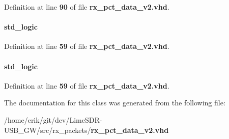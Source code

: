 Definition at line {\bf 90} of file {\bf rx\+\_\+pct\+\_\+data\+\_\+v2.\+vhd}.

\paragraph[{tx\+\_\+pct\+\_\+loss\+\_\+reg0}]{ {\bfseries \textcolor{comment}{std\+\_\+logic}\textcolor{vhdlchar}{ }} \hspace{0.3cm}{\ttfamily [Signal]}}\label{classrx__pct__data__v2_1_1arch_a1331098bc324a5e77becd6d1ec897c17}


Definition at line {\bf 59} of file {\bf rx\+\_\+pct\+\_\+data\+\_\+v2.\+vhd}.

\paragraph[{tx\+\_\+pct\+\_\+loss\+\_\+reg1}]{ {\bfseries \textcolor{comment}{std\+\_\+logic}\textcolor{vhdlchar}{ }} \hspace{0.3cm}{\ttfamily [Signal]}}\label{classrx__pct__data__v2_1_1arch_ad45fae23772af42864c7ee10476bbb27}


Definition at line {\bf 59} of file {\bf rx\+\_\+pct\+\_\+data\+\_\+v2.\+vhd}.



The documentation for this class was generated from the following file\+:\begin{DoxyCompactItemize}
\item 
/home/erik/git/dev/\+Lime\+S\+D\+R-\/\+U\+S\+B\+\_\+\+G\+W/src/rx\+\_\+packets/{\bf rx\+\_\+pct\+\_\+data\+\_\+v2.\+vhd}\end{DoxyCompactItemize}

